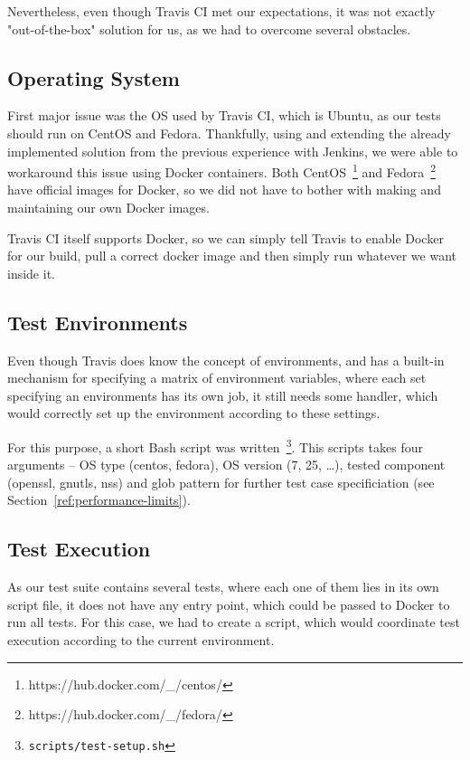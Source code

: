     Nevertheless, even though Travis CI met our expectations, it was not exactly
    "out-of-the-box" solution for us, as we had to overcome several obstacles.


\subsection{Operating System}
    First major issue was the OS used by Travis CI, which is Ubuntu, as our
    tests should run on CentOS and Fedora. Thankfully, using and extending the
    already implemented solution from the previous experience with
    Jenkins, we were able to workaround this issue using Docker containers.
    Both CentOS~\footnote{https://hub.docker.com/\_/centos/} and
    Fedora~\footnote{https://hub.docker.com/\_/fedora/} have official images
    for Docker, so we did not have to bother with making and maintaining our
    own Docker images.

    Travis CI itself supports Docker, so we can simply tell Travis to enable
    Docker for our build, pull a correct docker image and then simply run
    whatever we want inside it.

\subsection{Test Environments}
    Even though Travis does know the concept of environments, and has a built-in
    mechanism for specifying a matrix of environment variables, where each
    set specifying an environments has its own job, it still needs some handler,
    which would correctly set up the environment according to these settings.

    For this purpose, a short Bash script was written~\footnote{\texttt{scripts/test-setup.sh}}.
    This scripts takes four arguments -- OS type
    (centos, fedora), OS version (7, 25, \dots), tested component (openssl, gnutls,
    nss) and glob pattern for further test case specificiation
    (see Section~\ref{ref:performance-limits}).


\subsection{Test Execution}
    As our test suite contains several tests, where each one of them lies in
    its own script file, it does not have any entry point, which could be passed
    to Docker to run all tests. For this case, we had to create a script,
    which would coordinate test execution according to the current environment.

